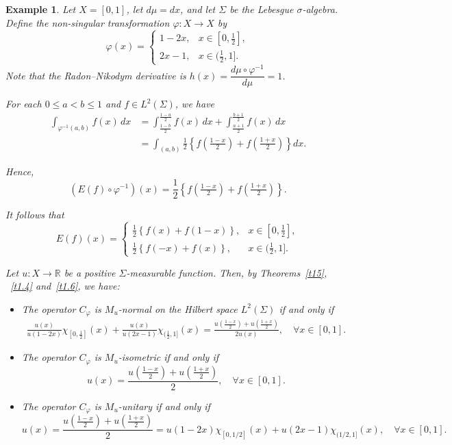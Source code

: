 \documentclass{amsart}
\newtheorem{exam}[thm]{Example}
\theoremstyle{definition}\newtheorem{defn}[thm]{Definition}
\theoremstyle{remark}
\numberwithin{equation}{section}
\begin{document}
\begin{exam}
Let \( X = [0, 1] \), let \( d\mu = dx \), and let \( \Sigma \) be the Lebesgue \(\sigma\)-algebra. Define the non-singular transformation \( \varphi : X \rightarrow X \) by
\[
\varphi(x) = 
\begin{cases}
1 - 2x, & x \in [0, \tfrac{1}{2}], \\
2x - 1, & x \in (\tfrac{1}{2}, 1].
\end{cases}
\]
Note that the Radon–Nikodym derivative is \( h(x) = \dfrac{d\mu \circ \varphi^{-1}}{d\mu} = 1 \).

For each \( 0 \leq a < b \leq 1 \) and \( f \in L^2(\Sigma) \), we have
\begin{align*}
\int_{\varphi^{-1}(a, b)} f(x) \, dx 
&= \int_{\frac{1 - b}{2}}^{\frac{1 - a}{2}} f(x) \, dx + \int_{\frac{a + 1}{2}}^{\frac{b + 1}{2}} f(x) \, dx \\
&= \int_{(a, b)} \frac{1}{2} \left\{ f\left( \tfrac{1 - x}{2} \right) + f\left( \tfrac{1 + x}{2} \right) \right\} dx.
\end{align*}

Hence,
\[
(E(f) \circ \varphi^{-1})(x) = \frac{1}{2} \left\{ f\left( \tfrac{1 - x}{2} \right) + f\left( \tfrac{1 + x}{2} \right) \right\}.
\]

It follows that
\[
E(f)(x) = 
\begin{cases}
\frac{1}{2} \left\{ f(x) + f(1 - x) \right\}, & x \in [0, \tfrac{1}{2}], \\
\frac{1}{2} \left\{ f(-x) + f(x) \right\}, & x \in (\tfrac{1}{2}, 1].
\end{cases}
\]

Let \( u : X \to \mathbb{R} \) be a positive \( \Sigma \)-measurable function. Then, by Theorems~\ref{t15}, ~\ref{t1.4}   and~\ref{t1.6}, we have:

\begin{itemize}
    \item The operator \( C_{\varphi} \) is \( M_u \)-normal on the Hilbert space \( L^2(\Sigma) \) if and only if
   \begin{align*}
\frac{u(x)}{u(1 - 2x)} \chi_{[0, \frac{1}{2}]}(x) 
+ \frac{u(x)}{u(2x - 1)} \chi_{(\frac{1}{2}, 1]}(x) 
= \frac{u\left( \tfrac{1 - x}{2} \right) + u\left( \tfrac{1 + x}{2} \right)}{2u(x)}, 
\quad \forall x \in [0, 1].
\end{align*}


    \item The operator \( C_{\varphi} \) is \( M_u \)-isometric if and only if
    \[
    u(x) = \frac{u\left( \frac{1 - x}{2} \right) + u\left( \frac{1 + x}{2} \right)}{2}, \quad \forall x \in [0, 1].
    \]

    \item The operator \( C_{\varphi} \) is \( M_u \)-unitary if and only if
    \[
    u(x) = \frac{u\left( \frac{1 - x}{2} \right) + u\left( \frac{1 + x}{2} \right)}{2} = u(1 - 2x)\chi_{[0,1/2]}(x) + u(2x - 1)\chi_{(1/2,1]}(x), \quad \forall x \in [0, 1].
    \]
\end{itemize}
\end{exam}
\end{document}
